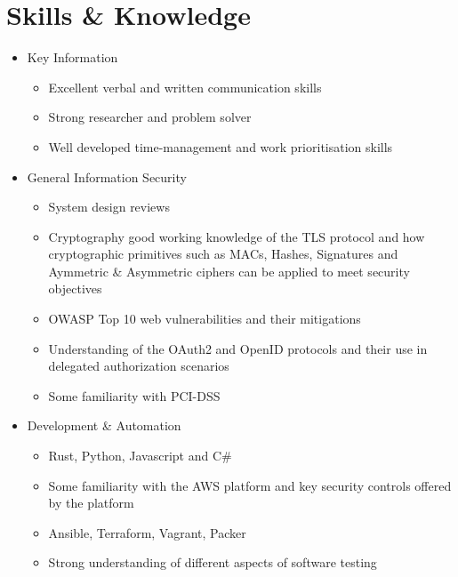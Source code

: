 \documentclass[a4paper,10pt]{article} %
\begin{document}

\section{Skills \& Knowledge}
\begin{itemize}
\item Key Information
	\begin{itemize}
		\item Excellent verbal and written communication skills
		\item Strong researcher and problem solver
		\item Well developed time-management and work prioritisation skills
	\end{itemize}
\item General Information Security
	\begin{itemize}
		\item System design reviews
		\item Cryptography \textemdash good working knowledge of the TLS protocol and how cryptographic primitives such as MACs, Hashes, Signatures and Aymmetric \& Asymmetric ciphers can be applied to meet security objectives
		\item OWASP Top 10 web vulnerabilities and their mitigations
		\item Understanding of the OAuth2 and OpenID protocols and their use in delegated authorization scenarios
		\item Some familiarity with PCI-DSS
	\end{itemize}
\item Development \& Automation
	\begin{itemize}
		\item Rust, Python, Javascript and C\#
		\item Some familiarity with the AWS platform and key security controls offered by the platform
		\item Ansible, Terraform, Vagrant, Packer
		\item Strong understanding of different aspects of software testing
	\end{itemize}
\end{itemize}

\end{document}
